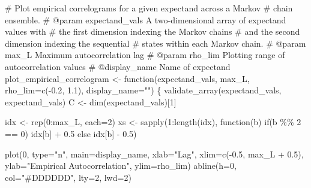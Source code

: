\documentclass[
  letterpaper,
  DIV=11,
  numbers=noendperiod]{scrartcl}
\newenvironment{Shaded}{\begin{snugshade}}{\end{snugshade}}
\newcommand{\BuiltInTok}[1]{\textcolor[rgb]{0.00,0.23,0.31}{#1}}
\newcommand{\CommentTok}[1]{\textcolor[rgb]{0.37,0.37,0.37}{#1}}
\newcommand{\ControlFlowTok}[1]{\textcolor[rgb]{0.00,0.23,0.31}{#1}}
\newcommand{\DecValTok}[1]{\textcolor[rgb]{0.68,0.00,0.00}{#1}}
\newcommand{\FloatTok}[1]{\textcolor[rgb]{0.68,0.00,0.00}{#1}}
\newcommand{\NormalTok}[1]{\textcolor[rgb]{0.00,0.23,0.31}{#1}}
\newcommand{\OperatorTok}[1]{\textcolor[rgb]{0.37,0.37,0.37}{#1}}
\newcommand{\StringTok}[1]{\textcolor[rgb]{0.13,0.47,0.30}{#1}}
\begin{document}
\begin{Shaded}
\begin{Highlighting}[]
\CommentTok{\# Plot empirical correlograms for a given expectand across a Markov }
\CommentTok{\# chain ensemble.}
\CommentTok{\# @param expectand\_vals A two{-}dimensional array of expectand values with}
\CommentTok{\#                       the first dimension indexing the Markov chains}
\CommentTok{\#                       and the second dimension indexing the sequential}
\CommentTok{\#                       states within each Markov chain.}
\CommentTok{\# @param max\_L Maximum autocorrelation lag}
\CommentTok{\# @param rho\_lim Plotting range of autocorrelation values}
\CommentTok{\# @display\_name Name of expectand}
\NormalTok{plot\_empirical\_correlogram }\OperatorTok{\textless{}{-}}\NormalTok{ function(expectand\_vals,}
\NormalTok{                                       max\_L,}
\NormalTok{                                       rho\_lim}\OperatorTok{=}\NormalTok{c(}\OperatorTok{{-}}\FloatTok{0.2}\NormalTok{, }\FloatTok{1.1}\NormalTok{),}
\NormalTok{                                       display\_name}\OperatorTok{=}\StringTok{""}\NormalTok{) \{}
\NormalTok{  validate\_array(expectand\_vals, }\StringTok{\textquotesingle{}expectand\_vals\textquotesingle{}}\NormalTok{)}
\NormalTok{  C }\OperatorTok{\textless{}{-}}\NormalTok{ dim(expectand\_vals)[}\DecValTok{1}\NormalTok{]}
  
\NormalTok{  idx }\OperatorTok{\textless{}{-}}\NormalTok{ rep(}\DecValTok{0}\NormalTok{:max\_L, each}\OperatorTok{=}\DecValTok{2}\NormalTok{)}
\NormalTok{  xs }\OperatorTok{\textless{}{-}}\NormalTok{ sapply(}\DecValTok{1}\NormalTok{:length(idx), function(b) }\ControlFlowTok{if}\NormalTok{(b }\OperatorTok{\%\%} \DecValTok{2} \OperatorTok{==} \DecValTok{0}\NormalTok{) idx[b] }\OperatorTok{+} \FloatTok{0.5}
                                          \ControlFlowTok{else}\NormalTok{ idx[b] }\OperatorTok{{-}} \FloatTok{0.5}\NormalTok{)}

\NormalTok{  plot(}\DecValTok{0}\NormalTok{, }\BuiltInTok{type}\OperatorTok{=}\StringTok{"n"}\NormalTok{, main}\OperatorTok{=}\NormalTok{display\_name,}
\NormalTok{       xlab}\OperatorTok{=}\StringTok{"Lag"}\NormalTok{, xlim}\OperatorTok{=}\NormalTok{c(}\OperatorTok{{-}}\FloatTok{0.5}\NormalTok{, max\_L }\OperatorTok{+} \FloatTok{0.5}\NormalTok{),}
\NormalTok{       ylab}\OperatorTok{=}\StringTok{"Empirical Autocorrelation"}\NormalTok{, ylim}\OperatorTok{=}\NormalTok{rho\_lim)}
\NormalTok{  abline(h}\OperatorTok{=}\DecValTok{0}\NormalTok{, col}\OperatorTok{=}\StringTok{"\#DDDDDD"}\NormalTok{, lty}\OperatorTok{=}\DecValTok{2}\NormalTok{, lwd}\OperatorTok{=}\DecValTok{2}\NormalTok{)}


\end{Highlighting}
\end{Shaded}
\end{document}
